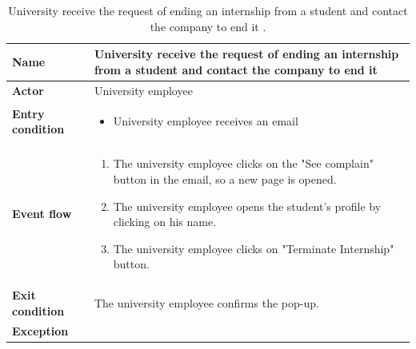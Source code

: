     \begin{table}[H]
        \centering
        \begin{tabular}{|l|p{11.9cm}|}
        \hline
        \textbf{Name}            & University receive the request of ending an internship from a student and contact the company to end it \\\hline
        \textbf{Actor}           & University employee     \\\hline
        \textbf{Entry condition} &
        \begin{itemize}
              \item University employee receives an email 
        \end{itemize}                                        \\\hline
        \textbf{Event flow}      &
        \begin{enumerate}[label=\arabic*.]
              \item The university employee clicks on the "See complain" button in the email, so a new page is opened.
              \item The university employee opens the student's profile by clicking on his name.
              \item The university employee clicks on "Terminate Internship" button.
              
        \end{enumerate}            \\\hline
        \textbf{Exit condition}  & The university employee confirms the pop-up.  \\\hline
        \textbf{Exception}       &    \\\hline
        \end{tabular}
        \caption{University receive the request of ending an internship from a student and contact the company to end it .}
        \label{table:University receive the request of ending an internship from a student and contact the company to end it }
    \end{table}

